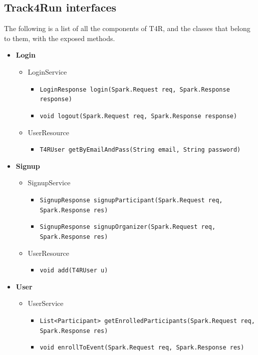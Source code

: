\documentclass[a4paper, hidelinks, 12pt]{report}
\begin{document}
	\subsection{Track4Run interfaces}
	The following is a list of all the components of T4R, and the classes that belong to them, with the exposed methods.
	\begin{itemize}
		\item{\textbf{Login}}
			\begin{itemize}
				\item{LoginService}
					\begin{itemize}
						\item{\verb|LoginResponse login(Spark.Request req, Spark.Response response)|}
						\item{\verb|void logout(Spark.Request req, Spark.Response response)|}
					\end{itemize}
				\item{UserResource}
					\begin{itemize}
						\item{\verb|T4RUser getByEmailAndPass(String email, String password)|}
					\end{itemize}
			\end{itemize}
		\item{\textbf{Signup}}
			\begin{itemize}
				\item{SignupService}
					\begin{itemize}
						\item{\verb|SignupResponse signupParticipant(Spark.Request req, Spark.Response res)|}
						\item{\verb|SignupResponse signupOrganizer(Spark.Request req, Spark.Response res)|}
					\end{itemize}
				\item{UserResource}
					\begin{itemize}
						\item{\verb|void add(T4RUser u)|}
					\end{itemize}
			\end{itemize}
		\item{\textbf{User}}
			\begin{itemize}
				\item{UserService}
					\begin{itemize}
						\item{\verb|List<Participant> getEnrolledParticipants(Spark.Request req, Spark.Response res)|}
						\item{\verb|void enrollToEvent(Spark.Request req, Spark.Response res)|}

\end{itemize}
\end{itemize}
\end{itemize}
\end{document}
